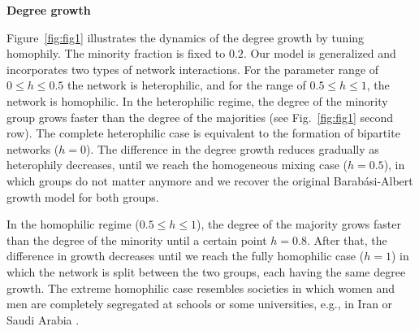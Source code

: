 \noindent \textbf{Degree growth}

\noindent Figure~\ref{fig:fig1} illustrates the dynamics of the degree growth by tuning homophily. The minority fraction is fixed to $0.2$. Our model is generalized and incorporates two types of network interactions. For the parameter range of $ 0 \leq h \leq 0.5$ the network is heterophilic, and for the range of $ 0.5 \leq h \leq 1$, the network is homophilic. In the heterophilic regime, the degree of the minority group grows faster than the degree of the majorities (see Fig.~\ref{fig:fig1} second row). The complete heterophilic case is equivalent to the formation of bipartite networks ($h=0$).  The difference in the degree growth reduces gradually as heterophily decreases, until we reach the homogeneous mixing case ($h=0.5$), in which groups do not matter anymore and we recover the original Barab\'{a}si-Albert growth model for both groups.

In the homophilic regime ($ 0.5 \leq h \leq 1$), the degree of the majority grows faster than the degree of the minority until a certain point $h = 0.8$. After that, the difference in growth decreases until we reach the fully homophilic case ($h = 1$) in which the network is split between the two groups, each having the same degree growth. The extreme homophilic case resembles societies in which women and men are completely segregated at schools or some universities, e.g., in Iran or Saudi Arabia \cite{mehran2003paradox}.

